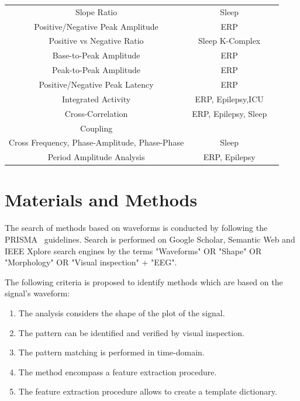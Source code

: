 \documentclass[brainsci,article,submit,moreauthors,pdftex,10pt,a4paper]{mdpi}
\begin{document}
\begin{table}[H]
\begin{tabular}{ccc}
Slope Ratio    & Sleep &  \citep{Subha2010} \\
Positive/Negative Peak Amplitude & ERP & \citep{Thakor2004,Hartman2005,Tatum2008,Mak2012,MullerPutz2015,Cole2017} \\
Positive vs Negative Ratio    & Sleep K-Complex &  \citep{EEGIntro} \\
Base-to-Peak Amplitude     & ERP  &  \citep{Cole2017} \\
Peak-to-Peak Amplitude     & ERP  &  \citep{Wulsin2011,Mak2012} \\
Positive/Negative Peak Latency                                 & ERP  & \citep{Mak2012}  \\
Integrated Activity               & ERP, Epilepsy,ICU & \citep{Wulsin2011,Uchida1999, Shah2015} \\
Cross-Correlation                & ERP, Epilepsy, Sleep & \citep{Cacioppo2007, Shah2015} \\
Coupling \\ Cross Frequency,  Phase-Amplitude, Phase-Phase     & Sleep & \citep{Cole2017} \\
Period Amplitude Analysis  & ERP, Epilepsy & \citep{Uchida1999,Cacioppo2007, Shah2015} \\
\bottomrule
\end{tabular}
\label{tab:methods}
\end{table}


\section{Materials and Methods}

The search of methods based on waveforms is conducted by following the PRISMA~\citep{Moher2009} guidelines.  Search is performed on Google Scholar, Semantic Web and IEEE Xplore search engines by the terms "Waveforms" OR "Shape" OR "Morphology" OR "Visual inspection" + "EEG".

The following criteria is proposed to identify methods which are based on the signal's waveform:

\begin{enumerate}
\item The analysis considers the shape of the plot of the signal.
\item The pattern can be identified and verified by visual inspection.
\item The pattern matching is performed in time-domain.
\item The method encompass a feature extraction procedure.
\item The feature extraction procedure allows to create a template dictionary.
\end{enumerate}
\end{document}
